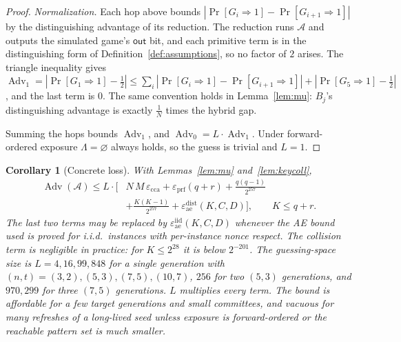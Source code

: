 \documentclass[pdflatex,sn-mathphys-num]{sn-jnl}
\theoremstyle{plain}
\newtheorem{corollary}[theorem]{Corollary}
\theoremstyle{definition}
\newcommand{\Adv}{\operatorname{Adv}}
\begin{document}
\begin{proof}
\emph{Normalization.} Each hop above bounds $|\Pr[G_i\Rightarrow1]-\Pr[G_{i+1}\Rightarrow1]|$ by the distinguishing advantage of its reduction. The reduction runs $\mathcal A$ and outputs the simulated game's $\mathsf{out}$ bit, and each primitive term is in the distinguishing form of Definition~\ref{def:assumptions}, so no factor of $2$ arises. The triangle inequality gives $\Adv_1=|\Pr[G_1\Rightarrow1]-\tfrac12|\le\sum_i|\Pr[G_i\Rightarrow1]-\Pr[G_{i+1}\Rightarrow1]|+|\Pr[G_5\Rightarrow1]-\tfrac12|$, and the last term is $0$. The same convention holds in Lemma~\ref{lem:mu}: $B_j$'s distinguishing advantage is exactly $\tfrac1N$ times the hybrid gap.

Summing the hops bounds $\Adv_1$, and $\Adv_0=L\cdot\Adv_1$. Under forward-ordered exposure $\Lambda=\varnothing$ always holds, so the guess is trivial and $L=1$.
\end{proof}

\begin{corollary}[Concrete loss]\label{cor:loss}
With Lemmas~\ref{lem:mu} and~\ref{lem:keycoll},
\begin{align*}
 \Adv(\mathcal A)\le L\cdot\Big[&N\,M\,\varepsilon_{\mathrm{cca}}+\varepsilon_{\mathrm{prf}}(q+r)+\frac{q(q-1)}{2^{257}}\\
 &+\frac{K(K-1)}{2^{257}}+\varepsilon^{\mathrm{dist}}_{\mathrm{ae}}(K,C,D)\Big],\qquad K\le q+r.
\end{align*}
The last two terms may be replaced by $\varepsilon^{\mathrm{iid}}_{\mathrm{ae}}(K,C,D)$ whenever the AE bound used is proved for i.i.d.\ instances with per-instance nonce respect. The collision term is negligible in practice: for $K\le2^{28}$ it is below $2^{-201}$.
The guessing-space size is $L=4,16,99,848$ for a single generation with $(n,t)=(3,2),(5,3),(7,5),(10,7)$, $256$ for two $(5,3)$ generations, and $970{,}299$ for three $(7,5)$ generations. $L$ multiplies every term. The bound is affordable for a few target generations and small committees, and vacuous for many refreshes of a long-lived seed unless exposure is forward-ordered or the reachable pattern set is much smaller.
\end{corollary}
\end{document}
